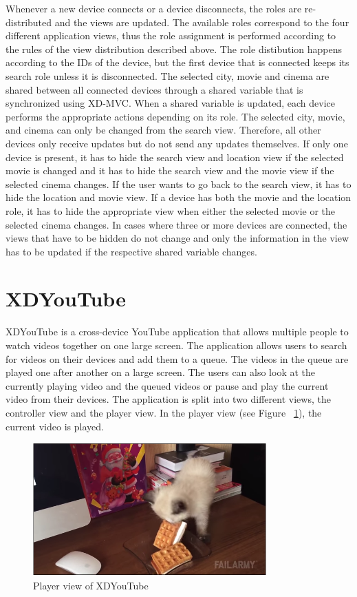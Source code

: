 Whenever a new device connects or a device disconnects, the roles are re-distributed and the views are updated. The available roles correspond to the four different application views, thus the role assignment is performed according to the rules of the view distribution described above. The role distibution happens according to the IDs of the device, but the first device that is connected keeps its search role unless it is disconnected. The selected city, movie and cinema are shared between all connected devices through a shared variable that is synchronized using XD-MVC. When a shared variable is updated, each device performs the appropriate actions depending on its role. The selected city, movie, and cinema can only be changed from the search view. Therefore, all other devices only receive updates but do not send any updates themselves. If only one device is present, it has to hide the search view and location view if the selected movie is changed and it has to hide the search view and the movie view if the selected cinema changes. If the user wants to go back to the search view, it has to hide the location and movie view. If a device has both the movie and the location role, it has to hide the appropriate view when either the selected movie or the selected cinema changes. In cases where three or more devices are connected, the views that have to be hidden do not change and only the information in the view has to be updated if the respective shared variable changes. 

\section{XDYouTube}

XDYouTube is a cross-device YouTube application that allows multiple people to watch videos together on one large screen. The application allows users to search for videos on their devices and add them to a queue. The videos in the queue are played one after another on a large screen. The users can also look at the currently playing video and the queued videos or pause and play the current video from their devices. The application is split into two different views, the controller view and the player view. In the player view (see Figure ~\ref{fig:xdyt_player}), the current video is played. 

\begin{figure}[H]
  \centering
    \includegraphics[width=0.8\textwidth]{images/screenshots/xdyt/player.png}
	\caption{Player view of XDYouTube}
	\label{fig:xdyt_player}
\end{figure}

